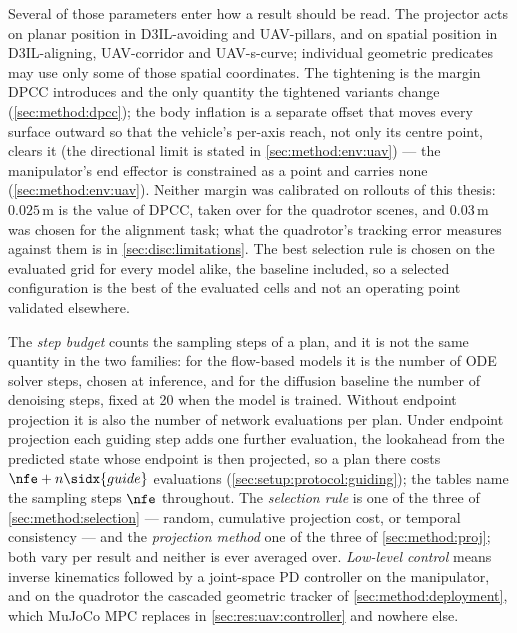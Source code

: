 Several of those parameters enter how a result should be read. The projector acts on planar position in
D3IL-avoiding and UAV-pillars, and on spatial position in D3IL-aligning, UAV-corridor and UAV-s-curve;
individual geometric predicates may use only some of those spatial coordinates. The tightening is the margin
\ac{DPCC} introduces and the only quantity the tightened variants change (\autoref{sec:method:dpcc}); the body
inflation is a separate offset that moves every surface outward so that the vehicle's per-axis reach, not only its
centre point, clears it (the directional limit is stated in \autoref{sec:method:env:uav}) --- the manipulator's end effector is constrained as a point and carries none
(\autoref{sec:method:env:uav}). Neither margin was calibrated on rollouts of this thesis: $0.025$\,m is the value
of \ac{DPCC}, taken over for the quadrotor scenes, and $0.03$\,m was chosen for the alignment task; what the
quadrotor's tracking error measures against them is in \autoref{sec:disc:limitations}. The best selection rule is
chosen on the evaluated grid for every model alike, the baseline included, so a selected configuration is the
best of the evaluated cells and not an operating point validated elsewhere.

The \emph{step budget} counts the sampling steps of a plan, and it is not the same quantity in the two
families: for the flow-based models it is the number of ODE solver steps, chosen at inference, and for
the diffusion baseline the number of denoising steps, fixed at 20 when the model is trained. Without
endpoint projection it is also the number of network evaluations per plan. Under endpoint projection each
guiding step adds one further evaluation, the lookahead from the predicted state whose endpoint is then
projected, so a plan there costs
$\nfe + n\sidx{guide}$ evaluations (\autoref{sec:setup:protocol:guiding}); the tables name the sampling
steps $\nfe$ throughout.
The \emph{selection rule} is one of the three of \autoref{sec:method:selection} --- random, cumulative
projection cost, or temporal consistency --- and the \emph{projection method} one of the three of
\autoref{sec:method:proj}; both vary per result and neither is ever averaged over. \emph{Low-level
control} means inverse kinematics followed by a joint-space PD controller on the manipulator, and on the
quadrotor the cascaded geometric tracker of \autoref{sec:method:deployment}, which MuJoCo MPC replaces in
\autoref{sec:res:uav:controller} and nowhere else.

